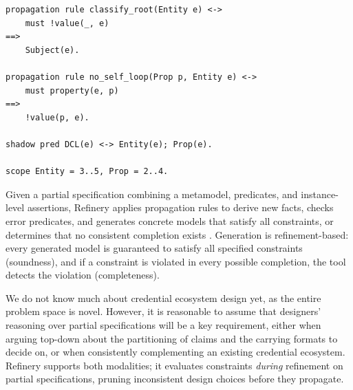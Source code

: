 \begin{lstlisting}[style=refinery, caption={Propagation rules, shadow predicate, and scope constraint}, label=lst:refinery-mechanisms]
propagation rule classify_root(Entity e) <->
    must !value(_, e)
==>
    Subject(e).

propagation rule no_self_loop(Prop p, Entity e) <->
    must property(e, p)
==>
    !value(p, e).

shadow pred DCL(e) <-> Entity(e); Prop(e).

scope Entity = 3..5, Prop = 2..4.
\end{lstlisting}

Given a partial specification combining a metamodel, predicates, and instance-level assertions, Refinery applies propagation rules to derive new facts, checks error predicates, and generates concrete models that satisfy all constraints, or determines that no consistent completion exists \citep{semerath_graph_2018}. Generation is refinement-based: every generated model is guaranteed to satisfy all specified constraints (soundness), and if a constraint is violated in every possible completion, the tool detects the violation (completeness).


We do not know much about credential ecosystem design yet, as the entire problem space is novel. However, it is reasonable to assume that designers' reasoning over partial specifications will be a key requirement, either when arguing top-down about the partitioning of claims and the carrying formats to decide on, or when consistently complementing an existing credential ecosystem. Refinery supports both modalities; it evaluates constraints \emph{during} refinement on partial specifications, pruning inconsistent design choices before they propagate.
